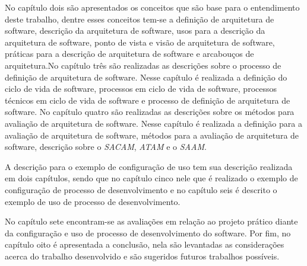 No capítulo dois são apresentados os conceitos que são base para o entendimento deste trabalho, dentre esses conceitos tem-se a definição de arquitetura de software, descrição da arquitetura de software, usos para a descrição da arquitetura de software, ponto de vista e visão de arquitetura de software, práticas para a descrição de arquitetura de software e arcabouços de arquitetura.No capítulo três são realizadas as descrições sobre o processo de definição de arquitetura de software. Nesse capítulo é realizada a definição do ciclo de vida de software, processos em ciclo de vida de software, processos técnicos em ciclo de vida de software e processo de definição de arquitetura de software.
No capítulo quatro são realizadas as descrições sobre os métodos para avaliação de arquitetura de software. Nesse capítulo é realizada a definição para a avaliação de arquitetura de software, métodos para a avaliação de arquitetura de software, descrição sobre o \emph{\acrfull{SACAM}}, \emph{\acrfull{ATAM}} e o \emph{\acrfull{SAAM}}. 

A descrição  para o exemplo de configuração de uso tem sua descrição realizada em dois capítulos, sendo que no capítulo cinco nele que é realizado o exemplo de configuração de processo de desenvolvimento e no capítulo seis é descrito o exemplo de uso de processo de desenvolvimento.

No capítulo sete encontram-se as avaliações em relação ao projeto prático diante da configuração e uso de processo de desenvolvimento do software. Por fim, no capítulo oito é apresentada a conclusão, nela são levantadas as considerações acerca do trabalho desenvolvido e são sugeridos futuros trabalhos possíveis.